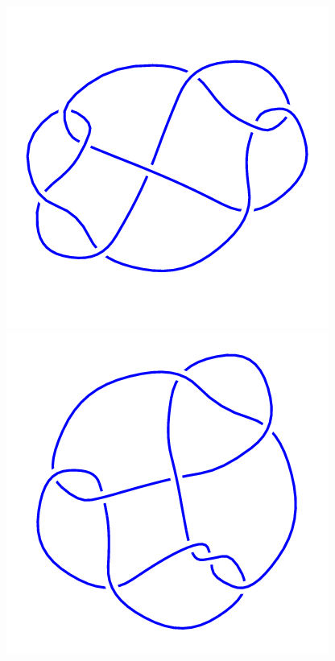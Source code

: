 \begin{figure}[H]
\begin{minipage}[b]{.18\linewidth}
    \end{minipage}
    \begin{minipage}[b]{.18\linewidth}
        \centering
        \includegraphics[width=\linewidth]{../data/9_23.png}
    \end{minipage}
    \begin{minipage}[b]{.18\linewidth}
        \centering
        \includegraphics[width=\linewidth]{../data/9_24.png}

\end{minipage}
\end{figure}
